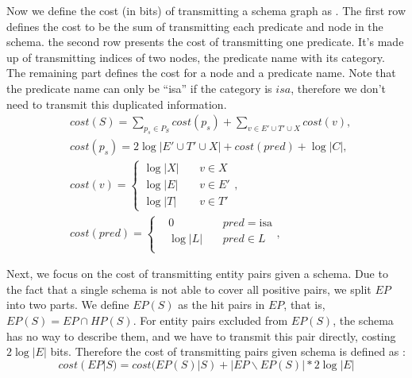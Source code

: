 
Now we define the cost (in bits) of transmitting a schema graph as .
The first row defines the cost to be the sum of transmitting each predicate and node in the schema.
the second row presents the cost of transmitting one predicate. It's made up of transmitting
indices of two nodes, the predicate name with its category.
The remaining part defines the cost for a node and a predicate name.
Note that the predicate name can only be ``isa'' if the category is $isa$,
therefore we don't need to transmit this duplicated information.
\begin{equation}
\label{eqn:costs}
\begin{aligned}
    & cost(S)      = \sum\limits_{p_s \in P_S} cost(p_s) + \sum\limits_{v \in E' \cup T' \cup X} cost(v), \\
    & cost(p_s)    = 2\log{|E' \cup T' \cup X|} + cost(pred) + \log{|C|}, \\
    & cost(v)      = \left\{
        \begin{aligned}
        \log{|X|} & ~     & v \in X  \\
        \log{|E|} & ~     & v \in E' \\
        \log{|T|} & ~     & v \in T'
        \end{aligned}
    \right., \\
    & cost(pred)   = \left\{
        \begin{aligned}
        & 0         & ~     & pred = \text{isa}  \\
        & \log{|L|} & ~     & pred \in L \\
        \end{aligned}
    \right.,
\end{aligned}
\end{equation}

Next, we focus on the cost of transmitting entity pairs given a schema.
Due to the fact that a single schema is not able to cover all positive pairs,
we split $EP$ into two parts.
We define $EP(S)$ as the hit pairs in $EP$, that is, $EP(S) = EP \cap HP(S)$.
For entity pairs excluded from $EP(S)$, the schema has no way to describe them,
and we have to transmit this pair directly, costing $2\log{|E|}$ bits.
Therefore the cost of transmitting pairs given schema is defined as :
\begin{equation}
\label{eqn:cost-ep-s}
    cost(EP|S) = cost(EP(S)|S) + |EP \backslash EP(S)|*2\log{|E|}
\end{equation}

